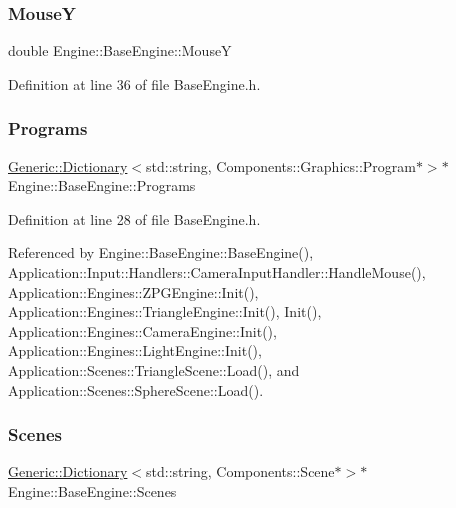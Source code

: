 \subsubsection{\texorpdfstring{MouseY}{MouseY}}
{\footnotesize\ttfamily double Engine\+::\+Base\+Engine\+::\+MouseY\hspace{0.3cm}{\ttfamily [inherited]}}



Definition at line 36 of file Base\+Engine.\+h.

\mbox{\label{classEngine_1_1BaseEngine_ae0f86360ea3a384caefe443dd8f88601}} 
\subsubsection{\texorpdfstring{Programs}{Programs}}
{\footnotesize\ttfamily \mbox{\hyperlink{classGeneric_1_1Dictionary}{Generic\+::\+Dictionary}}$<$std\+::string, Components\+::\+Graphics\+::\+Program$\ast$$>$$\ast$ Engine\+::\+Base\+Engine\+::\+Programs\hspace{0.3cm}{\ttfamily [inherited]}}



Definition at line 28 of file Base\+Engine.\+h.



Referenced by Engine\+::\+Base\+Engine\+::\+Base\+Engine(), Application\+::\+Input\+::\+Handlers\+::\+Camera\+Input\+Handler\+::\+Handle\+Mouse(), Application\+::\+Engines\+::\+Z\+P\+G\+Engine\+::\+Init(), Application\+::\+Engines\+::\+Triangle\+Engine\+::\+Init(), Init(), Application\+::\+Engines\+::\+Camera\+Engine\+::\+Init(), Application\+::\+Engines\+::\+Light\+Engine\+::\+Init(), Application\+::\+Scenes\+::\+Triangle\+Scene\+::\+Load(), and Application\+::\+Scenes\+::\+Sphere\+Scene\+::\+Load().

\mbox{\label{classEngine_1_1BaseEngine_afd02af3c2fbe9bb734db014dec06585a}} 
\subsubsection{\texorpdfstring{Scenes}{Scenes}}
{\footnotesize\ttfamily \mbox{\hyperlink{classGeneric_1_1Dictionary}{Generic\+::\+Dictionary}}$<$std\+::string, Components\+::\+Scene$\ast$$>$$\ast$ Engine\+::\+Base\+Engine\+::\+Scenes\hspace{0.3cm}{\ttfamily [inherited]}}



